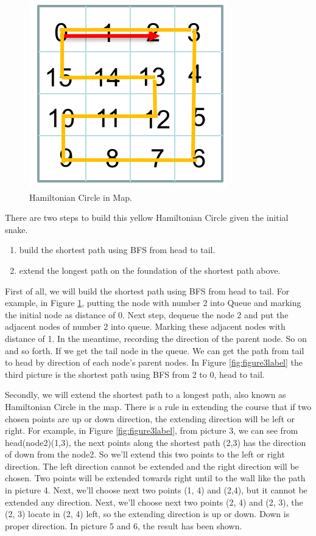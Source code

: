 \documentclass[12pt]{article}
\begin{document}
\begin{figure}[H]
\centering 
\includegraphics[scale = 0.8]{Picture1.png}
\caption{Hamiltonian Circle in Map.}
\label{fig:figure2label}
\end{figure}

There are two steps to build this yellow Hamiltonian Circle given the initial snake.
\begin{enumerate}
    \item build the shortest path using BFS from head to tail. 
    \item extend the longest path on the foundation of the shortest path above.
\end{enumerate}

First of all, we will build the shortest path using BFS from head to tail. For example, in Figure \ref{fig:figure2label}, putting the node with number 2 into Queue and marking the initial node as distance of 0. Next step, dequeue the node 2 and put the adjacent nodes of number 2 into queue. Marking these adjacent nodes with distance of 1. In the meantime, recording the direction of the parent node. So on and so forth. If we get the tail node in the queue. We can get the path from tail to head by direction of each node's parent nodes. In Figure \ref{fig:figure3label} the third picture is the shortest path using BFS from 2 to 0, head to tail.

Secondly, we will extend the shortest path to a longest path, also known as Hamiltonian Circle in the map. There is a rule in extending the course that if two chosen points are up or down direction, the extending direction will be left or right. For example, in Figure \ref{fig:figure3label}, from picture 3, we can see from head(node2)(1,3), the next points along the shortest path (2,3) has the direction of down from the node2. So we'll extend this two points to the left or right direction. The left direction cannot be extended and the right direction will be chosen. Two points will be extended towards right until to the wall like the path in picture 4. Next, we'll choose next two points (1, 4) and (2,4), but it cannot be extended any direction. Next, we'll choose next two points (2, 4) and (2, 3), the (2, 3) locate in (2, 4) left, so the extending direction is up or down. Down is proper direction. In picture 5 and 6, the result has been shown.
\end{document}
